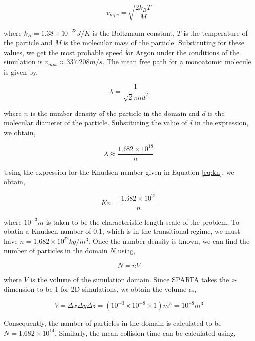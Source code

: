 \begin{equation} \label{eq:v_mps}
	v_{mps} = \sqrt{\frac{2 k_B T}{M}}
\end{equation}

\no where $k_B = 1.38 \times 10^{-23} J/K$ is the Boltzmann constant, $T$ is the temperature of the particle and $M$ is the molecular mass of the particle. Substituting for these values, we get the most probable speed for Argon under the conditions of the simulation is $v_{mps} \approx 337.208 m/s$. The mean free path for a monoatomic molecule is given by,

\begin{equation} \label{eq:mean_free_path}
	\lambda = \frac{1}{\sqrt{2}\pi n d^2}
\end{equation}

\no where $n$ is the number density of the particle in the domain and $d$ is the molecular diameter of the particle. Substituting the value of $d$ in the expression, we obtain, 

\begin{equation}
	\lambda \approx \frac{1.682 \times 10^{18}}{n}
\end{equation}

\no Using the expression for the Knudsen number given in Equation \ref{eq:kn}, we obtain,

\begin{equation}
	Kn = \frac{1.682 \times 10^{21}}{n}
\end{equation}

\no where $10^{-3} m$ is taken to be the characteristic length scale of the problem. To obatin a Knudsen number of 0.1, which is in the transitional regime, we must have $n =  1.682 \times 10^{22} kg/m^3$. Once the number density is known, we can find the number of particles in the domain $N$ using,

\begin{equation}
	N = n V
\end{equation}

\no where $V$ is the volume of the simulation domain. Since SPARTA takes the $z$-dimension to be 1 for 2D simulations, we obtain the volume as,

\begin{equation}
	V = \Delta x \Delta y \Delta z = \left( 10^{-3} \times 10^{-8} \times 1\right)  m^3 = 10^{-8} m^3 
\end{equation}

\no Consequently, the number of particles in the domain is calculated to be $N = 1.682 \times 10^{14}$. Similarly, the mean collision time can be calculated using,

